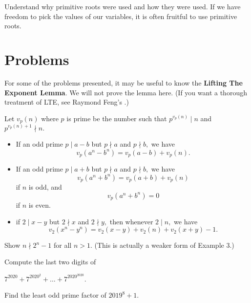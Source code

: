 \documentclass{article}
\begin{document}
Understand why primitive roots were used and how they were used. If we have freedom to pick the values of our variables, it is often fruitful to use primitive roots.

\pagebreak

\section{Problems}

For some of the problems presented, it may be useful to know the \textbf{Lifting The Exponent Lemma}. We will not prove the lemma here. (If you want a thorough treatment of LTE, see Raymond Feng's .)

\begin{theo}
Let $v_p(n)$ where $p$ is prime be the number such that $p^{v_p(n)} \mid n$ and $p ^{v_p(n)+1} \nmid n.$

\begin{itemize}
    \item If an odd prime $p \mid a-b$ but $p \nmid a$ and $p \nmid b,$ we have $$v_p(a^n - b^n) = v_p(a-b)+v_p(n).$$

    \item If an odd prime $p \mid a+b$ but $p \nmid a$ and $p \nmid b,$ we have $$v_p(a^n + b^n) = v_p(a+b)+v_p(n)$$ if $n$ is odd, and $$v_p(a^n + b^n) = 0$$ if $n$ is even.

    \item if $2 \mid x - y$ but $2 \nmid x$ and $2 \nmid y,$ then whenever $2 \mid n,$ we have $$v_2(x^n-y^n) = v_2(x-y)+v_2(n)+v_2(x+y)-1.$$
\end{itemize}
\end{theo}

\noindent{}


\begin{prob}[]{1}
Show $n \nmid 2^n-1$ for all $n>1.$ (This is actually a weaker form of Example 3.)
\end{prob}

\begin{prob}{1}
Compute the last two digits of

$7^{2020}+7^{2020^2}+\ldots +7^{2020^{2020}}$.
\end{prob}

\begin{prob}[AIME I 2019/14]{2}
Find the least odd prime factor of $2019^8+1$.
\end{prob}
\end{document}
